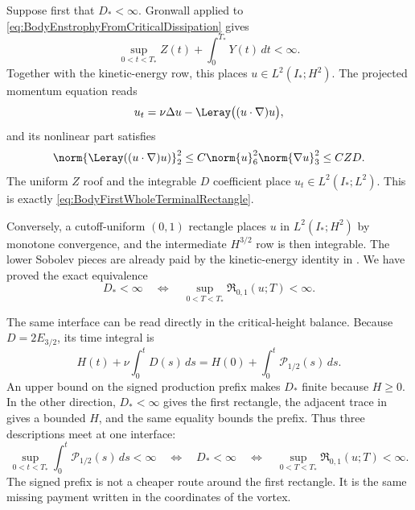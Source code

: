 Suppose first that \(D_*<\infty\).  Gronwall applied to
\eqref{eq:BodyEnstrophyFromCriticalDissipation} gives
\begin{equation}\label{eq:BodyEnstrophyAndHtwoFromDissipation}
  \sup_{0<t<T_*}Z(t)+\int_0^{T_*}Y(t)\,dt<\infty.
\end{equation}
Together with the kinetic-energy row, this places
\(u\in L^2(I_*;H^2)\).  The projected momentum equation reads
\[
  u_t=\nu\Delta u-\Leray\bigl((u\cdot\nabla)u\bigr),
\]
and its nonlinear part satisfies
\begin{equation}\label{eq:BodyNonlinearityFromCriticalDissipation}
  \norm{\Leray((u\cdot\nabla)u)}_2^2
  \leq C\norm{u}_6^2\norm{\nabla u}_3^2
  \leq C ZD.
\end{equation}
The uniform \(Z\) roof and the integrable \(D\) coefficient place
\(u_t\in L^2(I_*;L^2)\).  This is exactly
\eqref{eq:BodyFirstWholeTerminalRectangle}.

Conversely, a cutoff-uniform \((0,1)\) rectangle places \(u\) in
\(L^2(I_*;H^2)\) by monotone convergence, and the intermediate
\(H^{3/2}\) row is then integrable.  The lower Sobolev pieces are already paid
by the kinetic-energy identity in
.  We have proved the exact
equivalence
\begin{equation}\label{eq:BodyFirstRectangleCriticalDissipationEquivalence}
  D_*<\infty
  \quad\Longleftrightarrow\quad
  \sup_{0<T<T_*}\mathfrak R_{0,1}(u;T)<\infty.
\end{equation}

The same interface can be read directly in the critical-height balance.
Because \(D=2E_{3/2}\), its time integral is
\begin{equation}\label{eq:BodyCriticalPrefixIdentity}
  H(t)+\nu\int_0^tD(s)\,ds
  =H(0)+\int_0^t\mathcal P_{1/2}(s)\,ds.
\end{equation}
An upper bound on the signed production prefix makes \(D_*\) finite because
\(H\geq0\).  In the other direction, \(D_*<\infty\) gives the first rectangle,
the adjacent trace in  gives a bounded
\(H\), and the same equality bounds the prefix.  Thus three descriptions meet
at one interface:
\begin{equation}\label{eq:BodyFirstRectangleSignedPrefixEquivalence}
  \sup_{0<t<T_*}\int_0^t\mathcal P_{1/2}(s)\,ds<\infty
  \quad\Longleftrightarrow\quad
  D_*<\infty
  \quad\Longleftrightarrow\quad
  \sup_{0<T<T_*}\mathfrak R_{0,1}(u;T)<\infty.
\end{equation}
The signed prefix is not a cheaper route around the first rectangle.  It is
the same missing payment written in the coordinates of the vortex.

